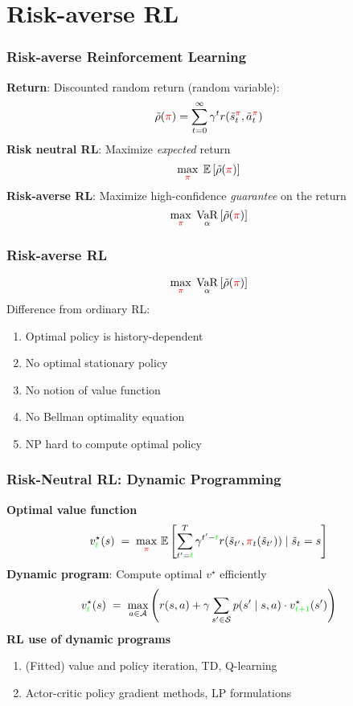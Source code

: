\documentclass{beamer}
\newcommand{\opt}{^{\star}}
\newcommand{\tc}[2]{\textcolor{#1}{#2}}
\newcommand{\tcr}[1]{\tc{red}{#1}}
\newcommand{\tcg}[1]{\tc{green}{#1}}
\newcommand{\E}{\mathbb{E}}
\newcommand{\Ex}[1]{\E \left[#1 \right]}
\DeclareMathOperator{\varo}{VaR}
\newcommand{\var}[2]{\varo_{#1} \left[#2\right]}
\begin{document}

\section{Risk-averse RL}

\begin{frame} \frametitle{Risk-averse Reinforcement Learning}
    \textbf{Return}: Discounted random return (random variable):
    \[
      \tilde{\rho}(\tcr{\pi}) = \sum_{t=0}^\infty \gamma^t r(\tilde{s}^{\tcr{\pi}}_t, \tilde{a}^{\tcr{\pi}}_t)
    \]
    \vfill
    \textbf{Risk neutral RL}: Maximize \emph{expected} return
    \[
        \max_{\tcr\pi} \; \Ex{\tilde{\rho}(\tcr\pi)}
    \]  
    \vfill
    \textbf{Risk-averse RL}: Maximize high-confidence \emph{guarantee} on the return
    \[
        \max_{\tcr\pi} \; \var{\alpha}{\tilde{\rho}(\tcr\pi)}    
    \]
\end{frame}

\begin{frame} \frametitle{Risk-averse RL}
  \[
        \max_{\tcr\pi} \; \var{\alpha}{\tilde{\rho}(\tcr\pi)}    
  \]
  \vfill
  Difference from ordinary RL:
  \begin{enumerate}
  \item Optimal policy is history-dependent
  \item No optimal stationary policy
  \item No notion of value function
  \item No Bellman optimality equation
  \item NP hard to compute optimal policy
  \end{enumerate}
\end{frame}
  

\begin{frame} \frametitle{Risk-Neutral RL: Dynamic Programming}
  \textbf{Optimal value function}
  \[
    v_{\tcg{t}}\opt(s) \;=\; \max_{\tcr{\pi}} \,
    \E\left[\sum_{t'=\tcg{t}}^T \gamma^{t' - \tcg{t}} r(\tilde{s}_{t'}, \tcr{\pi}_t(\tilde{s}_{t'})) \mid \tilde{s}_t = s \right] 
  \]
  \vfill 
  \textbf{Dynamic program}: Compute optimal $v\opt$ efficiently
  \[
   v_{\tcg{t}}\opt(s) \;=\; \max_{a\in \mathcal{A}}\left(  r(s,a) + \gamma \sum_{s'\in \mathcal{S}}  p(s' \mid s,a)\cdot  v_{\tcg{t+1}}\opt(s') \right) 
 \]
  \vfill  
  \textbf{ RL use of dynamic programs}
  \begin{enumerate}
    \item (Fitted) value and policy iteration, TD, Q-learning
    \item Actor-critic policy gradient methods, LP formulations
  \end{enumerate}
\end{frame}
\end{document}
